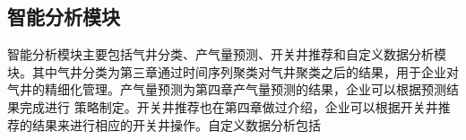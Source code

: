 \subsection{智能分析模块}
智能分析模块主要包括气井分类、产气量预测、开关井推荐和自定义数据分析模块。其中气井分类为第三章通过时间序列聚类对气井聚类之后的结果，用于企业对气井的精细化管理。产气量预测为第四章产气量预测的结果，企业可以根据预测结果完成进行
策略制定。开关井推荐也在第四章做过介绍，企业可以根据开关井推荐的结果来进行相应的开关井操作。自定义数据分析包括